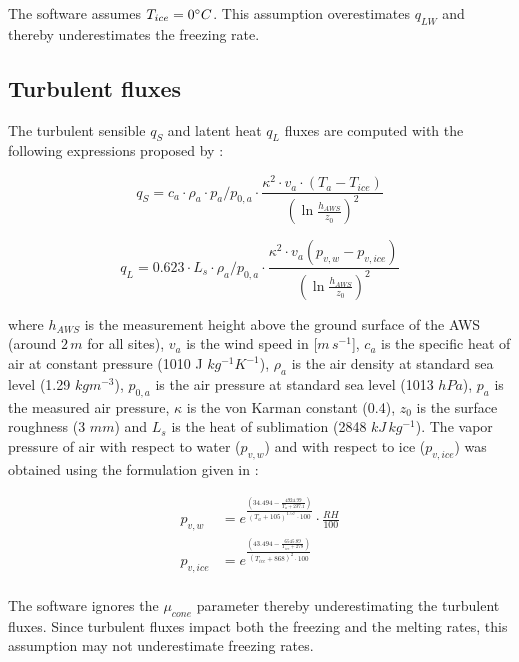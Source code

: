 \documentclass[utf8]{frontiersSCNS}
\begin{document}
The software assumes $T_{ice} = 0 \degree C$. This assumption overestimates $q_{LW}$ and thereby underestimates
the freezing rate.

\subsection{Turbulent fluxes} \label{sec:Qs}

The turbulent sensible $q_{S}$ and latent heat $q_{L}$ fluxes are computed with the following expressions
proposed by \cite{garrattAtmosphericBoundaryLayer1992}:

\begin{equation}
	q_{S}= c_{a} \cdot \rho_{a} \cdot p_{a}/p_{0,a} \cdot \frac{\kappa^2 \cdot v_a \cdot
		(T_a-T_{ice})}{{(\ln{\frac{h_{AWS}}{z_{0}}})}^2}
	\label{eqn:qs}
\end{equation}

\begin{equation}
	q_{L}= 0.623 \cdot L_s \cdot \rho_{a}/p_{0,a} \cdot \frac{\kappa^2 \cdot
	v_a(p_{v,w}-p_{v,ice})}{{(\ln{\frac{h_{AWS}}{z_{0}}})}^2}
\end{equation}

where $h_{AWS}$ is the measurement height above the ground surface of the AWS (around $2\,m$ for all sites),
$v_a$ is the wind speed in [$m\,s^{-1}$], $c_a$ is the specific heat of air at constant pressure (1010 J
$kg^{-1} K^{-1}$), $\rho_{a}$ is the air density at standard sea level (1.29 $kg m^{-3}$), $p_{0,a}$ is the air
pressure at standard sea level (1013 $hPa$), $p_{a}$ is the measured air pressure, $\kappa$ is the von Karman
constant (0.4), $z_{0}$ is the surface roughness (3 $mm$) and $L_s$ is the heat of sublimation (2848
$kJ\,kg^{-1}$).  The vapor pressure of air with respect to water ($p_{v,w}$) and with respect to ice
($p_{v,ice}$) was obtained using the formulation given in \cite{huangSimpleAccurateFormula2018} :

\begin{equation}
	\begin{split}
		p_{v,w}&=e^{\frac{(34.494 - \frac{4924.99}{T_{a} + 237.1})}{(T_a + 105)^{1.57} \cdot 100}} \cdot \frac{RH}{100} \\
		p_{v,ice}&=e^{\frac{(43.494 - \frac{6545.89}{T_{ice} + 278})}{(T_{ice} + 868)^{2} \cdot 100}} \\
	\end{split} \label{eqn:vp}
\end{equation}

The software ignores the $\mu_{cone}$ parameter thereby underestimating the turbulent fluxes. Since turbulent
fluxes impact both the freezing and the melting rates, this assumption may not underestimate freezing rates.
\end{document}
